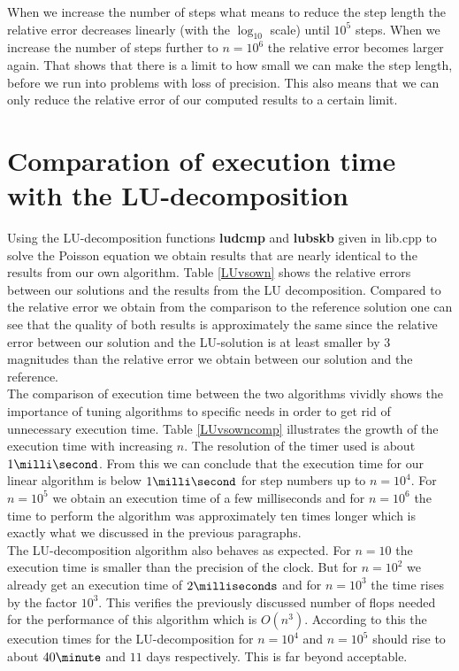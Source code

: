 \documentclass[11pt,a4wide]{article}
\begin{document}
When we increase the number of steps what means to reduce the step length the relative error decreases linearly (with the $\log_{10}$ scale) until $10^5$ steps. When we increase the number of steps further to $n=10^6$ the relative error becomes larger again. That shows that there is a limit to how small we can make the step length, before we run into problems with loss of precision. This also means that we can only reduce the relative error of our computed results to a certain limit.        
\section{Comparation of execution time with the LU-decomposition}
Using the LU-decomposition functions \textbf{ludcmp} and \textbf{lubskb}  given in lib.cpp to solve the Poisson equation we obtain results that are nearly identical to the results from our own algorithm. Table \ref{LUvsown} shows the relative errors between our solutions and the results from the LU decomposition. Compared to the relative error we obtain from the comparison to the reference solution one can see that the quality of both results is approximately the same since the relative error between our solution and the LU-solution is at least smaller by $3$ magnitudes than the relative error we obtain between our solution and the reference. \vspace{0.2cm}
\\ 
The comparison of execution time between the two algorithms vividly shows the importance of tuning algorithms to specific needs in order to get rid of unnecessary execution time. Table \ref{LUvsowncomp} illustrates the growth of the execution time with increasing $n$. The resolution of the timer used is about $1\milli\second$. From this we can conclude that the execution time for our linear algorithm is below $1\milli\second$ for step numbers up to $n=10^4$. For $n=10^5$ we obtain an execution time of a few milliseconds and for $n=10^6$ the time to perform the algorithm was approximately ten times longer which is exactly what we discussed in the previous paragraphs.
 \vspace{0.2cm}
\\
The LU-decomposition algorithm also behaves as expected.  For $n=10$ the execution time is smaller than the precision of the clock. But for $n=10^2$ we already get an execution time of $2\milliseconds$ and for $n=10^3$ the time rises by the factor $10^3$. This verifies the previously discussed number of flops needed for the performance of this algorithm which is $O(n^3)$. According to this the execution times for the LU-decomposition for $n=10^4$ and $n=10^5$ should rise to about $40\minute$ and $11$ days respectively. This is far beyond acceptable.
\end{document}
